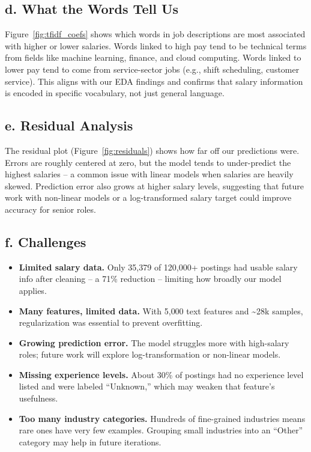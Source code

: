 \documentclass[11pt]{article}
\begin{document}
\subsection*{d. What the Words Tell Us}

Figure~\ref{fig:tfidf_coefs} shows which words in job descriptions are most associated with higher or lower salaries. Words linked to high pay tend to be technical terms from fields like machine learning, finance, and cloud computing. Words linked to lower pay tend to come from service-sector jobs (e.g., shift scheduling, customer service). This aligns with our EDA findings and confirms that salary information is encoded in specific vocabulary, not just general language.

\subsection*{e. Residual Analysis}

The residual plot (Figure~\ref{fig:residuals}) shows how far off our predictions were. Errors are roughly centered at zero, but the model tends to under-predict the highest salaries -- a common issue with linear models when salaries are heavily skewed. Prediction error also grows at higher salary levels, suggesting that future work with non-linear models or a log-transformed salary target could improve accuracy for senior roles.

\subsection*{f. Challenges}

\begin{itemize}
    \item \textbf{Limited salary data.} Only 35,379 of 120,000+ postings had usable salary info after cleaning -- a 71\% reduction -- limiting how broadly our model applies.
    \item \textbf{Many features, limited data.} With 5{,}000 text features and \textasciitilde28k samples, regularization was essential to prevent overfitting.
    \item \textbf{Growing prediction error.} The model struggles more with high-salary roles; future work will explore log-transformation or non-linear models.
    \item \textbf{Missing experience levels.} About 30\% of postings had no experience level listed and were labeled ``Unknown,'' which may weaken that feature's usefulness.
    \item \textbf{Too many industry categories.} Hundreds of fine-grained industries means rare ones have very few examples. Grouping small industries into an ``Other'' category may help in future iterations.
\end{itemize}
\end{document}
